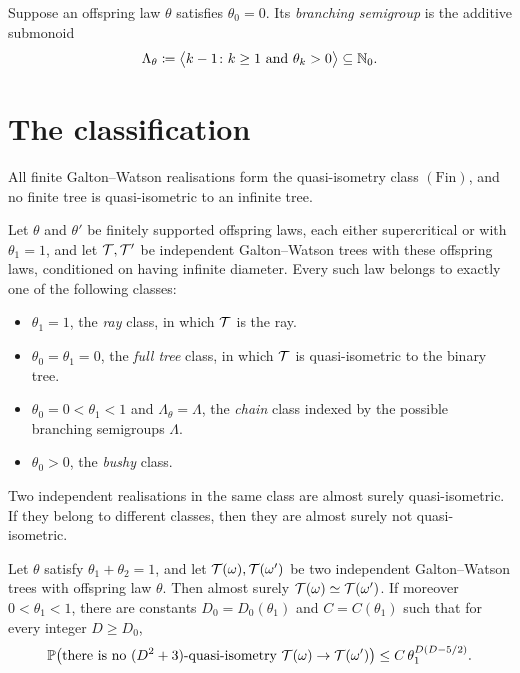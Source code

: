 \begin{definition}
\label{def:branching-semigroup}
\leanok
Suppose an offspring law $\theta$ satisfies $\theta_0=0$. Its \emph{branching semigroup} is
the additive submonoid
\[
 \Lambda_\theta
 \coloneqq\bigl\langle k-1 \colon k\geq1\text{ and }\theta_k>0\bigr\rangle
 \subseteq\mathbb{N}_0.
\]
\end{definition}

\section{The classification}

\begin{theorem}
\label{thm:trichotomy}
\leanok
{}
All finite Galton--Watson realisations form the quasi-isometry class $(\mathrm{Fin})$, and no
finite tree is quasi-isometric to an infinite tree.

Let $\theta$ and $\theta'$ be finitely supported offspring laws, each either supercritical or
with $\theta_1=1$, and let $\mathcal{T},\mathcal{T}'$ be independent Galton--Watson trees with these offspring
laws, conditioned on having infinite diameter. Every such law belongs to exactly one of the
following classes:
\begin{itemize}
 \item[(R)] $\theta_1=1$, the \emph{ray} class, in which $\mathcal{T}$ is the ray.
 \item[(F)] $\theta_0=\theta_1=0$, the \emph{full tree} class, in which $\mathcal{T}$ is
 quasi-isometric to the binary tree.
 \item[$(\mathrm{C}_\Lambda)$] $\theta_0=0<\theta_1<1$ and $\Lambda_\theta=\Lambda$, the
 \emph{chain} class indexed by the possible branching semigroups $\Lambda$.
 \item[(B)] $\theta_0>0$, the \emph{bushy} class.
\end{itemize}
Two independent realisations in the same class are almost surely quasi-isometric. If they
belong to different classes, then they are almost surely not quasi-isometric.
\end{theorem}

\begin{theorem}
\label{thm:twovalue}
\leanok
{}
Let $\theta$ satisfy $\theta_1+\theta_2=1$, and let $\mathcal{T}(\omega),\mathcal{T}(\omega')$ be two
independent Galton--Watson trees with offspring law $\theta$. Then almost surely
$\mathcal{T}(\omega)\simeq\mathcal{T}(\omega')$. If moreover $0<\theta_1<1$, there are constants
$D_0=D_0(\theta_1)$ and $C=C(\theta_1)$ such that for every integer $D\geq D_0$,
\[
 \mathbb{P}\bigl(\text{there is no }(D^2+3)\text{-quasi-isometry }\mathcal{T}(\omega)\to\mathcal{T}(\omega')\bigr)
 \leq C\,\theta_1^{D(D-5/2)}.
\]
\end{theorem}


